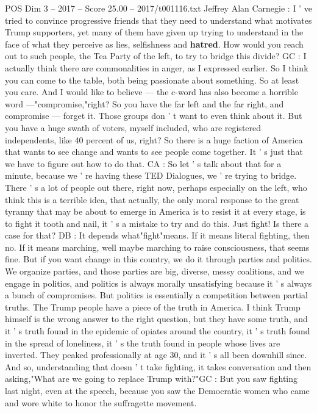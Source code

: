 \begin{textsample}{POS Dim 3 – 2017 – Score 25.00 – 2017/t001116.txt}
Jeffrey Alan Carnegie : I ' ve tried to convince progressive friends that they need to understand what motivates Trump supporters, yet many of them have given up trying to understand in the face of what they perceive as lies, selfishness and \textbf{hatred}.
How would you reach out to such people, the Tea Party of the left, to try to bridge this divide?
GC : I actually think there are commonalities in anger, as I expressed earlier.
So I think you can come to the table, both being passionate about something.
So at least you care.
And I would like to believe — the c-word has also become a horrible word —"compromise,"right?
So you have the far left and the far right, and compromise — forget it.
Those groups don ' t want to even think about it.
But you have a huge swath of voters, myself included, who are registered independents, like 40 percent of us, right?
So there is a huge faction of America that wants to see change and wants to see people come together.
It ' s just that we have to figure out how to do that.
CA : So let ' s talk about that for a minute, because we ' re having these TED Dialogues, we ' re trying to bridge.
There ' s a lot of people out there, right now, perhaps especially on the left, who think this is a terrible idea, that actually, the only moral response to the great tyranny that may be about to emerge in America is to resist it at every stage, is to fight it tooth and nail, it ' s a mistake to try and do this.
Just fight!
Is there a case for that?
DB : It depends what"fight"means.
If it means literal fighting, then no.
If it means marching, well maybe marching to raise consciousness, that seems fine.
But if you want change in this country, we do it through parties and politics.
We organize parties, and those parties are big, diverse, messy coalitions, and we engage in politics, and politics is always morally unsatisfying because it ' s always a bunch of compromises.
But politics is essentially a competition between partial truths.
The Trump people have a piece of the truth in America.
I think Trump himself is the wrong answer to the right question, but they have some truth, and it ' s truth found in the epidemic of opiates around the country, it ' s truth found in the spread of loneliness, it ' s the truth found in people whose lives are inverted.
They peaked professionally at age 30, and it ' s all been downhill since.
And so, understanding that doesn ' t take fighting, it takes conversation and then asking,"What are we going to replace Trump with?"GC : But you saw fighting last night, even at the speech, because you saw the Democratic women who came and wore white to honor the suffragette movement.

\end{textsample}
